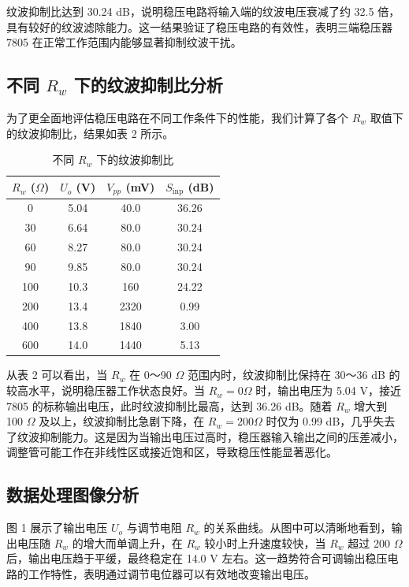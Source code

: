 ﻿\documentclass[12pt,a4paper]{article}
\begin{document}
纹波抑制比达到 30.24 dB，说明稳压电路将输入端的纹波电压衰减了约 32.5 倍，具有较好的纹波滤除能力。这一结果验证了稳压电路的有效性，表明三端稳压器 7805 在正常工作范围内能够显著抑制纹波干扰。

\subsection{不同 $R_w$ 下的纹波抑制比分析}

为了更全面地评估稳压电路在不同工作条件下的性能，我们计算了各个 $R_w$ 取值下的纹波抑制比，结果如表 2 所示。

\begin{table}[H]
\centering
\begin{tabular}{|c|c|c|c|}
\hline
$R_w$ ($\Omega$) & $U_o$ (V) & $V_{pp}$ (mV) & $S_{\text{inp}}$ (dB) \\
\hline
0 & 5.04 & 40.0 & 36.26 \\
\hline
30 & 6.64 & 80.0 & 30.24 \\
\hline
60 & 8.27 & 80.0 & 30.24 \\
\hline
90 & 9.85 & 80.0 & 30.24 \\
\hline
100 & 10.3 & 160 & 24.22 \\
\hline
200 & 13.4 & 2320 & 0.99 \\
\hline
400 & 13.8 & 1840 & 3.00 \\
\hline
600 & 14.0 & 1440 & 5.13 \\
\hline
\end{tabular}
\caption{不同 $R_w$ 下的纹波抑制比}
\end{table}

从表 2 可以看出，当 $R_w$ 在 0～90 $\Omega$ 范围内时，纹波抑制比保持在 30～36 dB 的较高水平，说明稳压器工作状态良好。当 $R_w = 0 \Omega$ 时，输出电压为 5.04 V，接近 7805 的标称输出电压，此时纹波抑制比最高，达到 36.26 dB。随着 $R_w$ 增大到 100 $\Omega$ 及以上，纹波抑制比急剧下降，在 $R_w = 200 \Omega$ 时仅为 0.99 dB，几乎失去了纹波抑制能力。这是因为当输出电压过高时，稳压器输入输出之间的压差减小，调整管可能工作在非线性区或接近饱和区，导致稳压性能显著恶化。

\subsection{数据处理图像分析}

图 1 展示了输出电压 $U_o$ 与调节电阻 $R_w$ 的关系曲线。从图中可以清晰地看到，输出电压随 $R_w$ 的增大而单调上升，在 $R_w$ 较小时上升速度较快，当 $R_w$ 超过 200 $\Omega$ 后，输出电压趋于平缓，最终稳定在 14.0 V 左右。这一趋势符合可调输出稳压电路的工作特性，表明通过调节电位器可以有效地改变输出电压。
\end{document}
